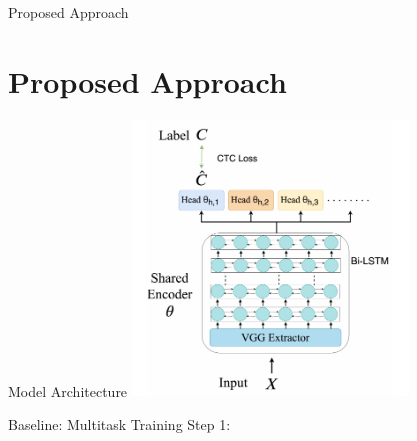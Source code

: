 \documentclass{beamer}
\begin{document}
\begin{frame}
	\begin{center}
    \LARGE{Proposed Approach}
	\end{center}
\end{frame}

\section{Proposed Approach}
\begin{frame}[t]{Model Architecture}
  \center \includegraphics[width=0.55\textwidth]{fig/model_arch.png}
\end{frame}

\begin{frame}[t]{Baseline: Multitask Training}
  Step 1:
\end{frame}





\end{document}
